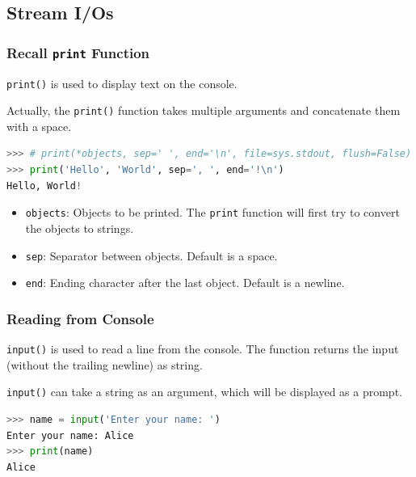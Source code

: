 \documentclass[beamer, en, version=2.0]{huangfusl-template}
\begin{document}
    \subsection{Stream I/Os}
    \begin{frame}[fragile]
        \frametitle{Recall {\small\texttt{print}} Function}

        {\footnotesize\verb|print()|} is used to display text on the console.

        Actually, the {\footnotesize\verb|print()|} function takes multiple arguments and concatenate them with a space.

\begin{lstlisting}[language=python]
>>> # print(*objects, sep=' ', end='\n', file=sys.stdout, flush=False)
>>> print('Hello', 'World', sep=', ', end='!\n')
Hello, World!
\end{lstlisting}

        \begin{itemize}
            \item {\footnotesize\verb|objects|}: Objects to be printed. The {\footnotesize\verb|print|} function will first try to convert the objects to strings.
            \item {\footnotesize\verb|sep|}: Separator between objects. Default is a space.
            \item {\footnotesize\verb|end|}: Ending character after the last object. Default is a newline.
        \end{itemize}
    \end{frame}
    \begin{frame}[fragile]
        \frametitle{Reading from Console}

        {\footnotesize\verb|input()|} is used to read a line from the console. The function returns the input (without the trailing newline) as string.

        {\footnotesize\verb|input()|} can take a string as an argument, which will be displayed as a prompt.

\begin{lstlisting}[language=python]
>>> name = input('Enter your name: ')
Enter your name: Alice
>>> print(name)
Alice
\end{lstlisting}

    \end{frame}
\end{document}
